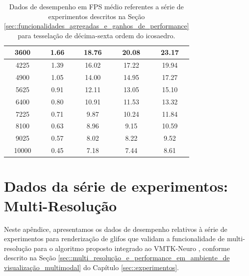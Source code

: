 \documentclass[
    12pt,                %
    oneside,            %
    a4paper,            %
    english,            %
    french,                %
    spanish,            %
    brazil                %
    ]{abntex2}
\begin{document}
\begin{apendicesenv}
\begin{table}[htb]
\begin{tabular}{c|c|c|c|c|}
\multicolumn{1}{|c|}{3600}      & 1.66                      & 18.76                     & 20.08                     & 23.17                    \\ \hline
\multicolumn{1}{|c|}{4225}      & 1.39                      & 16.02                     & 17.22                     & 19.94                    \\ \hline
\multicolumn{1}{|c|}{4900}      & 1.05                      & 14.00                     & 14.95                     & 17.27                    \\ \hline
\multicolumn{1}{|c|}{5625}      & 0.91                      & 12.11                     & 13.05                     & 15.10                    \\ \hline
\multicolumn{1}{|c|}{6400}      & 0.80                      & 10.91                     & 11.53                     & 13.32                    \\ \hline
\multicolumn{1}{|c|}{7225}      & 0.71                      & 9.87                      & 10.24                     & 11.84                    \\ \hline
\multicolumn{1}{|c|}{8100}      & 0.63                      & 8.96                      & 9.15                      & 10.59                    \\ \hline
\multicolumn{1}{|c|}{9025}      & 0.57                      & 8.02                      & 8.22                      & 9.52                     \\ \hline
\multicolumn{1}{|c|}{10000}     & 0.45                      & 7.18                      & 7.44                      & 8.61                     \\ \hline
\end{tabular}


\caption{Dados de desempenho em FPS médio referentes a série de experimentos descritos na Seção \ref{sec::funcionalidades_agregadas_e_ganhos_de_performance} para tesselação de décima-sexta ordem do icosaedro.}
\label{tab::testes_16}
\end{table}

\chapter{Dados da série de experimentos: Multi-Resolução}
\label{ap::performance_vmtk}

Neste apêndice, apresentamos os dados de desempenho relativos à série de experimentos para renderização de glifos que validam a funcionalidade de multi-resolução para o algoritmo proposto integrado ao VMTK-Neuro \cite{VMTKNeuro}, conforme descrito na Seção \ref{sec::multi_resolução_e_performance_em_ambiente_de visualização_multimodal} do Capítulo \ref{sec::experimentos}.


\end{apendicesenv}
\end{document}
